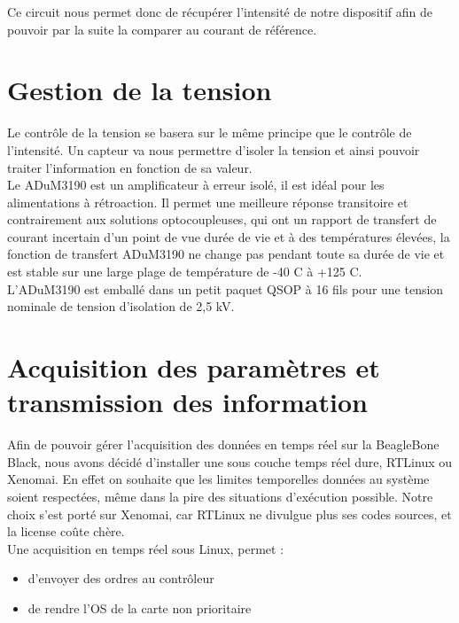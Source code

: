 \documentclass{report}
\begin{document}
Ce circuit nous permet donc de r\'{e}cup\'{e}rer l’intensit\'{e} de notre dispositif afin de pouvoir par la
suite la comparer au courant de r\'{e}f\'{e}rence.

\section{Gestion de la tension}

Le contrôle de la tension se basera sur le m\^{e}me principe que le contrôle de l’intensit\'{e}. Un
capteur va nous permettre d’isoler la tension et ainsi pouvoir traiter l’information en
fonction de sa valeur.\\



Le ADuM3190 est un amplificateur \`{a} erreur isol\'{e}, il est id\'{e}al pour les alimentations \`{a}
r\'{e}troaction. Il permet une meilleure r\'{e}ponse transitoire et contrairement aux solutions
optocoupleuses, qui ont un rapport de transfert de courant incertain d’un point de vue
dur\'{e}e de vie et \`{a} des temp\'{e}ratures \'{e}lev\'{e}es, la fonction de transfert ADuM3190 ne change
pas pendant toute sa dur\'{e}e de vie et est stable sur une large plage de temp\'{e}rature de -40 \degree C
\`{a} +125 \degree C.\\
L'ADuM3190 est emball\'{e} dans un petit paquet QSOP \`{a} 16 fils pour une tension nominale de
tension d'isolation de 2,5 kV.

\section{Acquisition des param\`{e}tres et transmission des information}

Afin de pouvoir g\'{e}rer l’acquisition des donn\'{e}es en temps r\'{e}el sur la BeagleBone Black, nous
avons d\'{e}cid\'{e} d’installer une sous couche temps r\'{e}el dure, RTLinux ou Xenomai. En effet on
souhaite que les limites temporelles donn\'{e}es au syst\`{e}me soient respect\'{e}es, m\^{e}me dans la
pire des situations d’ex\'{e}cution possible. Notre choix s’est port\'{e} sur Xenomai, car RTLinux ne
divulgue plus ses codes sources, et la license coûte ch\`{e}re.\\
Une acquisition en temps r\'{e}el sous Linux, permet :
\begin{itemize}
 \item d’envoyer des ordres au contrôleur
 \item de rendre l’OS de la carte non prioritaire
\end{itemize}
\end{document}
